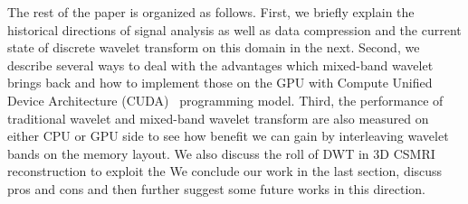 The rest of the paper is organized as follows. First, we briefly explain the historical directions of signal analysis as well as data compression and the current state of discrete wavelet transform on this domain in the next.
Second, we describe several ways to deal with the advantages which mixed-band wavelet brings back and how to implement those on the GPU with Compute Unified Device Architecture (CUDA)~\cite{CUDA} programming model.
Third, the performance of traditional wavelet and mixed-band wavelet transform are also measured on either CPU or GPU side to see how benefit we can gain by interleaving wavelet bands on the memory layout.
We also discuss the roll of DWT in 3D CSMRI reconstruction to exploit the  
We conclude our work in the last section, discuss pros and cons and then further suggest some future works in this direction.

